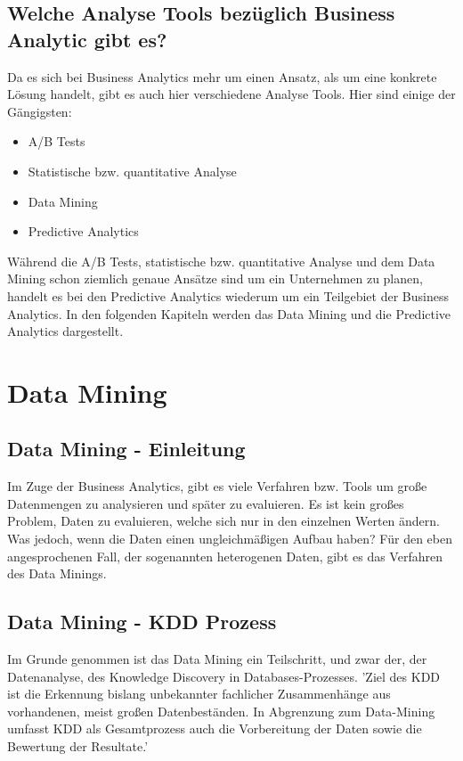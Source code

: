 \documentclass[12pt,twocolumn,twoside]{conference}   %
\begin{document}
\subsection{Welche Analyse Tools bezüglich Business Analytic gibt es?}
Da es sich bei Business Analytics mehr um einen Ansatz, als um eine konkrete Lösung handelt, gibt es auch hier verschiedene Analyse Tools. Hier sind einige der Gängigsten:

\begin{itemize}
\item A/B Tests
\item Statistische bzw. quantitative Analyse
\item Data Mining
\item Predictive Analytics
\end{itemize}

Während die A/B Tests, statistische bzw. quantitative Analyse und dem Data Mining schon ziemlich genaue Ansätze sind um ein Unternehmen zu planen, handelt es bei den Predictive Analytics wiederum um ein Teilgebiet der Business Analytics. In den folgenden Kapiteln werden das Data Mining und die Predictive Analytics dargestellt.

\section{Data Mining}
\subsection{Data Mining - Einleitung}
Im Zuge der Business Analytics, gibt es viele Verfahren bzw. Tools um große Datenmengen zu analysieren und später zu evaluieren. Es ist kein großes Problem, Daten zu evaluieren, welche sich nur in den einzelnen Werten ändern. Was jedoch, wenn die Daten einen ungleichmäßigen Aufbau haben? Für den eben angesprochenen Fall, der sogenannten heterogenen Daten, gibt es das Verfahren des Data Minings. 

\subsection{Data Mining - KDD Prozess}
Im Grunde genommen ist das Data Mining ein Teilschritt, und zwar der, der Datenanalyse, des Knowledge Discovery in Databases-Prozesses. 'Ziel des KDD ist die Erkennung bislang unbekannter fachlicher Zusammenhänge aus vorhandenen, meist großen Datenbeständen. In Abgrenzung zum Data-Mining umfasst KDD als Gesamtprozess auch die Vorbereitung der Daten sowie die Bewertung der Resultate.' \cite{Beispiel2:2016}
\end{document}

